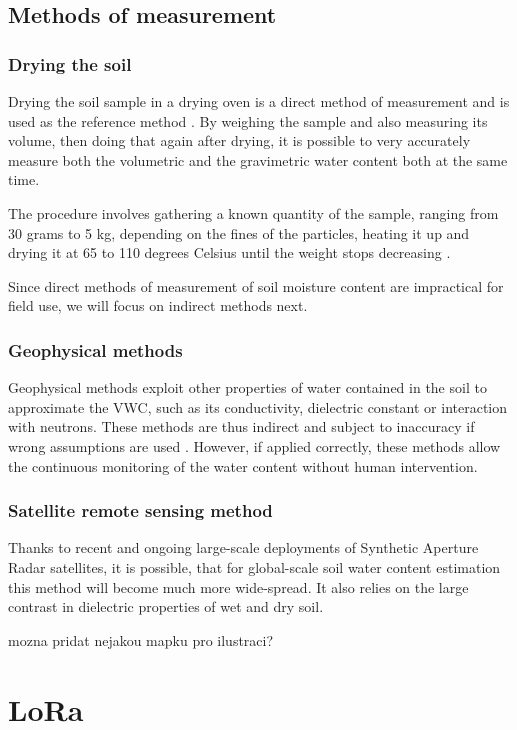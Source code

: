 \subsection{Methods of measurement}
\subsubsection{Drying the soil}
Drying the soil sample in a drying oven is a direct method of measurement and is used as the reference method \cite{webster_humidity_1998}. By weighing the sample and also measuring its volume, then doing that again after drying, it is possible to very accurately measure both the volumetric and the gravimetric water content both at the same time.

The procedure involves gathering a known quantity of the sample, ranging from 30 grams to 5 kg, depending on the fines of the particles, heating it up and drying it at 65 to 110 degrees Celsius until the weight stops decreasing \cite{department_of_sustainable_natural_resources_soil_2024,myjove_corporation_determination_2024, paul_soil_2007}.

Since direct methods of measurement of soil moisture content are impractical for field use, we will focus on indirect methods next.

\subsubsection{Geophysical methods}
Geophysical methods exploit other properties of water contained in the soil to approximate the VWC, such as its conductivity, dielectric constant or interaction with neutrons. These methods are thus indirect and subject to inaccuracy if wrong assumptions are used \cite{webster_humidity_1998}. However, if applied correctly, these methods allow the continuous monitoring of the water content without human intervention.



\subsubsection{Satellite remote sensing method}
Thanks to recent and ongoing large-scale deployments of Synthetic Aperture Radar satellites, it is possible, that for global-scale soil water content estimation this method will become much more wide-spread. It also relies on the large contrast in dielectric properties of wet and dry soil.

mozna pridat nejakou mapku pro ilustraci?


\section{LoRa}
